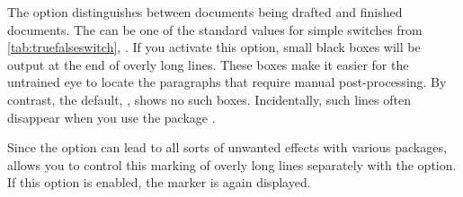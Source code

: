 \begin{Declaration}
\end{Declaration}%
The  option distinguishes between documents being drafted and finished
documents. The  can be one of the
standard values for simple switches from \autoref{tab:truefalseswitch},
. If you activate this
option, small black boxes will be output
at the end of overly long lines. These boxes make it easier for the untrained
eye to locate the paragraphs that require manual post-processing. By contrast,
the default, , shows no such boxes. Incidentally,
such lines often disappear when you use the
package \cite{package:microtype}.

Since the  option can lead to all sorts of unwanted effects with
various packages, \KOMAScript{} allows you to control this marking of overly
long lines separately with the
 option.  If
this option is enabled, the marker is again displayed.%
% 
\EndIndexGroup
%
\EndIndexGroup

